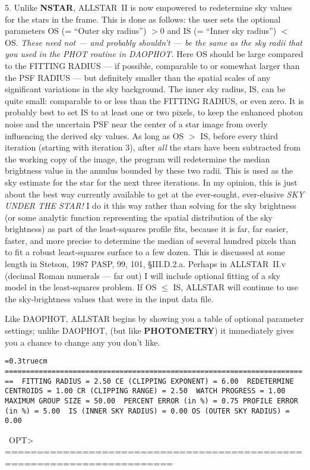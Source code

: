 \item{5.}  Unlike {\bf NSTAR}, ALLSTAR~II is now empowered to
redetermine sky values for the stars in the frame.  This is done as
follows:  the user sets the optional parameters OS (= ``Outer sky
radius'') $> 0$ and IS (= ``Inner sky radius'') $<$ OS. {\it These need
not --- and probably shouldn't --- be the same as the sky radii that
you used in the PHOT routine in DAOPHOT.\/}  Here OS should be large
compared to the FITTING RADIUS --- if possible, comparable to or
somewhat larger than the PSF RADIUS ---  but definitely smaller than
the spatial scales of any significant variations in the sky
background.  The inner sky radius, IS, can be quite small: comparable
to or less than the FITTING RADIUS, or even zero.  It is probably best
to set IS to at least one or two pixels, to keep the enhanced photon
noise and the uncertain PSF near the center of a star image from overly
influencing the derived sky values.  As long as OS $>$ IS, before every
third iteration (starting with iteration 3), after {\it all\/} the
stars have been subtracted from the working copy of the image, the
program will redetermine the median brightness value in the annulus
bounded by these two radii.  This is used as the sky estimate for the
star for the next three iterations.  In my opinion, this is just about
the best way currently available to get at the ever-sought,
ever-elusive {\it SKY UNDER THE STAR!\/}  I do it this way rather than
solving for the sky brightness (or some analytic function representing
the spatial distribution of the sky brightness) as part of the
least-squares profile fits, because it is far, far easier, faster, and
more precise to determine the median of several hundred pixels than to
fit a robust least-squares surface to a few dozen.  This is discussed
at some length in Stetson, 1987 PASP, 99, 101, \S III.D.2.a.  Perhaps
in ALLSTAR~II.v (decimal Roman numerals --- far out) I will include
optional fitting of a sky model in the least-squares problem.  If OS
$\leq$ IS, ALLSTAR will continue to use the sky-brightness values that
were in the input data file.

Like DAOPHOT, ALLSTAR begins by showing you a table of optional
parameter settings; unlike DAOPHOT, (but like {\bf PHOTOMETRY}) it
immediately gives you a chance to change any you don't like.

\bigskip
{\noindent\obeylines\obeyspaces\frenchspacing\tt\baselineskip=0.3truecm
========================================================================
\           FITTING RADIUS =  2.50       CE (CLIPPING EXPONENT) =  6.00
\    REDETERMINE CENTROIDS =  1.00          CR (CLIPPING RANGE) =  2.50
\           WATCH PROGRESS =  1.00           MAXIMUM GROUP SIZE = 50.00
\     PERCENT ERROR (in \%) =  0.75         PROFILE ERROR (in \%) =  5.00
\    IS (INNER SKY RADIUS) =  0.00        OS (OUTER SKY RADIUS) =  0.00

\ OPT> 
========================================================================
}
\bigskip

